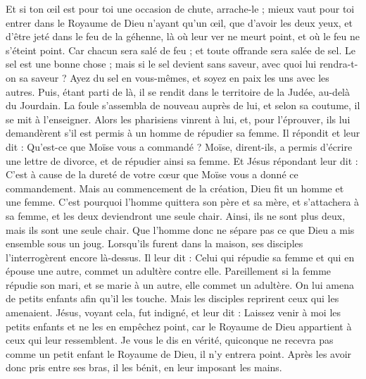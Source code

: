 \begin{multicols}{2}
Et si ton œil est pour toi une occasion de chute, arrache-le ; mieux vaut pour toi entrer dans le Royaume de Dieu n'ayant qu'un œil, que d'avoir les deux yeux, et d'être jeté dans le feu de la géhenne,
là où leur ver ne meurt point, et où le feu ne s'éteint point.
Car chacun sera salé de feu ; et toute offrande sera salée de sel.
Le sel est une bonne chose ; mais si le sel devient sans saveur, avec quoi lui rendra-t-on sa saveur ?
Ayez du sel en vous-mêmes, et soyez en paix les uns avec les autres.
\VerseOne{}Puis, étant parti de là, il se rendit dans le territoire de la Judée, au-delà du Jourdain. La foule s'assembla de nouveau auprès de lui, et selon sa coutume, il se mit à l'enseigner.
Alors les pharisiens vinrent à lui, et, pour l'éprouver, ils lui demandèrent s'il est permis à un homme de répudier sa femme.
Il répondit et leur dit : Qu'est-ce que Moïse vous a commandé ?
Moïse, dirent-ils, a permis d'écrire une lettre de divorce, et de répudier ainsi sa femme.
Et Jésus répondant leur dit : C'est à cause de la dureté de votre cœur que Moïse vous a donné ce commandement.
Mais au commencement de la création, Dieu fit un homme et une femme.
C'est pourquoi l'homme quittera son père et sa mère, et s'attachera à sa femme,
et les deux deviendront une seule chair. Ainsi, ils ne sont plus deux, mais ils sont une seule chair.
Que l'homme donc ne sépare pas ce que Dieu a mis ensemble sous un joug.
Lorsqu'ils furent dans la maison, ses disciples l'interrogèrent encore là-dessus.
Il leur dit : Celui qui répudie sa femme et qui en épouse une autre, commet un adultère contre elle.
Pareillement si la femme répudie son mari, et se marie à un autre, elle commet un adultère.
On lui amena de petits enfants afin qu'il les touche. Mais les disciples reprirent ceux qui les amenaient.
Jésus, voyant cela, fut indigné, et leur dit : Laissez venir à moi les petits enfants et ne les en empêchez point, car le Royaume de Dieu appartient à ceux qui leur ressemblent.
Je vous le dis en vérité, quiconque ne recevra pas comme un petit enfant le Royaume de Dieu, il n'y entrera point.
Après les avoir donc pris entre ses bras, il les bénit, en leur imposant les mains.

\end{multicols}
